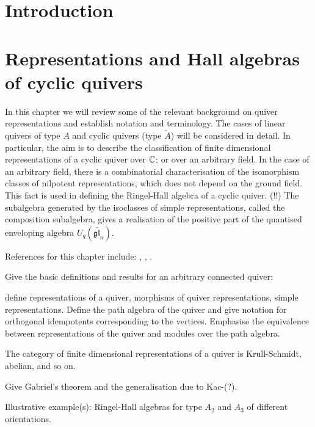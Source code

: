 \documentclass[a4paper, 11pt]{report}
\begin{document}
\maketitle

\tableofcontents

\chapter{Introduction}


\chapter{Representations and Hall algebras of cyclic quivers}

In this chapter we will review some of the relevant background on quiver representations and establish notation and terminology. The cases of linear quivers of type $A$ and cyclic quivers (type $\tilde{A}$) will be considered in detail. In particular, the aim is to describe the classification of finite dimensional representations of a cyclic quiver over $\mathbb{C}$; or over an arbitrary field. In the case of an arbitrary field, there is a combinatorial characterisation of the isomorphism classes of nilpotent representations, which does not depend on the ground field. This fact is used in defining the Ringel-Hall algebra of a cyclic quiver. (!!) The subalgebra generated by the isoclasses of simple representations, called the composition subalgebra, gives a realisation of the positive part of the quantised enveloping algebra $U_q(\tilde{\mathfrak{gl}_n})$.

References for this chapter include: \cite{hubery04}, \cite{hubery07}, \cite{deng15}.

{\color{gray}
Give the basic definitions and results for an arbitrary connected quiver:

define representations of a quiver, morphisms of quiver representations, simple representations. Define the path algebra of the quiver and give notation for orthogonal idempotents corresponding to the vertices. Emphasise the equivalence between representations of the quiver and modules over the path algebra.

The category of finite dimensional representations of a quiver is Krull-Schmidt, abelian, and so on.

Give Gabriel's theorem and the generalisation due to Kac-(?).

Illustrative example(s): Ringel-Hall algebras for type $A_2$ and $A_3$ of different orientations.}
\end{document}
